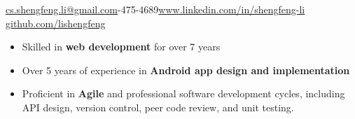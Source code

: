 \documentclass[10pt,a4paper]{article}
\begin{document}
\sloppy  %



\nobreakvspace{0.3em}  %

\noindent\href{mailto:cs.shengfeng.li@gmail.com}{cs.shengfeng.li@gmail.com}-475-4689\sbull\href{https://www.linkedin.com/in/shengfeng-li/}{www.linkedin.com/in/shengfeng-li}\sbull
\href{https://github.com/lishengfeng}{github.com/lishengfeng}

\spacedhrule{0em}{-1em}  %
\begin{itemize}
\setlength{\itemsep}{0.1em}
\item Skilled in \textbf{web development} for over 7 years
\item Over 5 years of experience in \textbf{Android app design and implementation}
\item Proficient in \textbf{Agile} and professional software development cycles, including API design, version control, peer code review, and unit testing.
\end{itemize}



\end{document}
